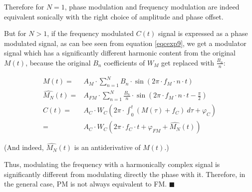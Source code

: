 \documentclass{article}
\begin{document}
    Therefore for $N = 1$, phase modulation and frequency modulation are indeed
    equivalent sonically with the right choice of amplitude and phase offset.

    But for $N > 1$, if the frequency modulated $C(t)$ signal is expressed as a
    phase modulated signal, as can bee seen from equation \ref{eqcexp9}, we get
    a modulator signal which has a significantly different harmonic content
    from the original $M(t)$, because the original $B_n$ coefficients of $W_M$
    get replaced with $\frac{B_n}{n}$:

    \begin{equation}
      \begin{split}
        M(t)
          = & A_M
              \cdot \sum_{n=1}^{N}
                B_n \cdot \sin \left( 2\pi \cdot f_M \cdot n \cdot t \right) \\
        \hat{M_N}(t)
          = & A_{FM}
              \cdot \sum_{n=1}^{N}
                \frac{B_n}{n}
                \cdot \sin \left(
                  2\pi \cdot f_M \cdot n \cdot t - \frac{\pi}{2}
                \right) \\
        C(t)
          = & A_C
              \cdot W_C \left(
                2\pi \cdot \int_{0}^{t} \left( M(\tau) + f_C \right) \  d\tau
                + \varphi_C
              \right) \\
          = & A_C
              \cdot W_C \left(
                2\pi \cdot f_C \cdot t + \varphi_{FM} + \hat{M_N}(t)
              \right)
      \end{split}
    \end{equation}

    (And indeed, $\hat{M_N}(t)$ is an antiderivative of $M(t)$.)

    Thus, modulating the frequency with a harmonically complex signal is
    significantly different from modulating directly the phase with it.
    Therefore, in the general case, PM is not always equivalent to FM.
    $\blacksquare$
\end{document}
